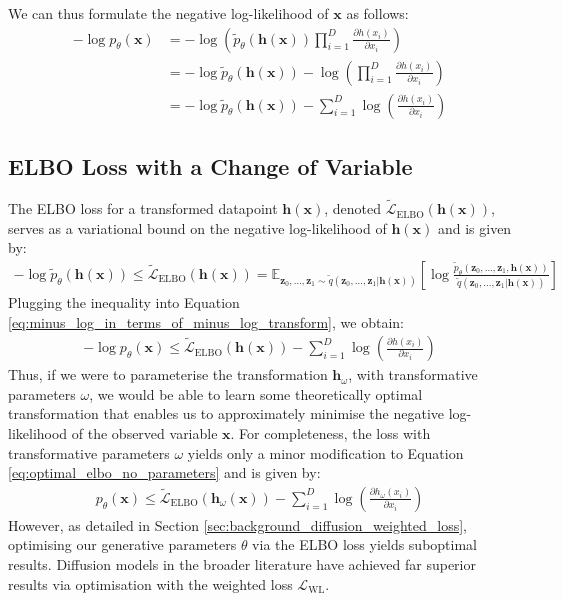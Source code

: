 \documentclass[ oneside,%
                    author={George Herbert},
                    degree={MSci},
                     title={Diffusion Models for Time-Evolving Precipitation Fields},
                  subtitle={}]{dissertation}
\begin{document}
We can thus formulate the negative log-likelihood of $\mathbf{x}$ as follows:
\begin{align}
      -\log p_\theta(\mathbf{x}) &= -\log \left(\tilde{p}_\theta(\mathbf{h}(\mathbf{x}))\prod_{i=1}^D\frac{\partial h(x_i)}{\partial x_i}\right)\\
      &= -\log \tilde{p}_\theta(\mathbf{h}(\mathbf{x})) - \log\left(\prod_{i=1}^D\frac{\partial h(x_i)}{\partial x_i}\right)\\
      &= -\log \tilde{p}_\theta(\mathbf{h}(\mathbf{x})) - \sum_{i=1}^D \log \left(\frac{\partial h(x_i)}{\partial x_i}\right)\label{eq:minus_log_in_terms_of_minus_log_transform}
\end{align}

\subsection{ELBO Loss with a Change of Variable}
\label{sec:results_elbo_change_of_variable}

The ELBO loss for a transformed datapoint $\mathbf{h}(\mathbf{x})$, denoted $\tilde{\mathcal{L}}_{\mathrm{ELBO}}(\mathbf{h}(\mathbf{x}))$, serves as a variational bound on the negative log-likelihood of $\mathbf{h}(\mathbf{x})$ and is given by:
\begin{align}
      -\log \tilde{p}_\theta(\mathbf{h}(\mathbf{x}))\le \tilde{\mathcal{L}}_{\mathrm{ELBO}}(\mathbf{h}(\mathbf{x})) = \mathbb{E}_{\mathbf{z}_0,\ldots,\mathbf{z}_1\sim\tilde{q}(\mathbf{z}_0,\ldots,\mathbf{z}_1|\mathbf{h}(\mathbf{x}))} \left[\log \frac{\tilde{p}_\theta(\mathbf{z}_0,\ldots,\mathbf{z}_1,\mathbf{h}(\mathbf{x}))}{\tilde{q}(\mathbf{z}_0,\ldots,\mathbf{z}_1|\mathbf{h}(\mathbf{x}))}\right]
\end{align}
Plugging the inequality into Equation \ref{eq:minus_log_in_terms_of_minus_log_transform}, we obtain:
\begin{align}
      -\log p_\theta(\mathbf{x})\le \tilde{\mathcal{L}}_{\mathrm{ELBO}}(\mathbf{h}(\mathbf{x})) - \sum_{i=1}^D \log \left(\frac{\partial h(x_i)}{\partial x_i}\right)\label{eq:optimal_elbo_no_parameters}
\end{align}
Thus, if we were to parameterise the transformation $\mathbf{h}_\omega$, with transformative parameters $\omega$, we would be able to learn some theoretically optimal transformation that enables us to approximately minimise the negative log-likelihood of the observed variable $\mathbf{x}$. For completeness, the loss with transformative parameters $\omega$ yields only a minor modification to Equation \ref{eq:optimal_elbo_no_parameters} and is given by:
\begin{align}
      p_\theta(\mathbf{x}) \le \tilde{\mathcal{L}}_{\mathrm{ELBO}}(\mathbf{h}_\omega(\mathbf{x})) - \sum_{i=1}^D \log \left(\frac{\partial h_\omega(x_i)}{\partial x_i}\right)\label{eq:optimal_elbo_parameters}
\end{align}
However, as detailed in Section \ref{sec:background_diffusion_weighted_loss}, optimising our generative parameters $\theta$ via the ELBO loss yields suboptimal results. Diffusion models in the broader literature have achieved far superior results via optimisation with the weighted loss $\mathcal{L}_{\mathrm{WL}}$.
\end{document}
